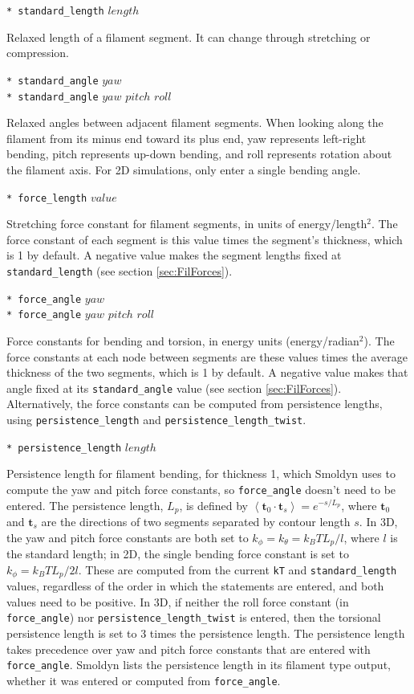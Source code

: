 \documentclass {scrbook}
\newcommand {\ttt} {\texttt}
\begin{document}
\begin{description}
\item{\ttt{* standard\_length} $length$}

Relaxed length of a filament segment. It can change through stretching or compression.

\item{\ttt{* standard\_angle} $yaw$\\
\ttt{* standard\_angle} $yaw$ $pitch$ $roll$}

Relaxed angles between adjacent filament segments. When looking along the filament from its minus end toward its plus end, yaw represents left-right bending, pitch represents up-down bending, and roll represents rotation about the filament axis. For 2D simulations, only enter a single bending angle.

\item{\ttt{* force\_length} $value$}

Stretching force constant for filament segments, in units of energy/length$^2$. The force constant of each segment is this value times the segment's thickness, which is 1 by default. A negative value makes the segment lengths fixed at \ttt{standard\_length} (see section \ref{sec:FilForces}).

\item{\ttt{* force\_angle} $yaw$\\
\ttt{* force\_angle} $yaw$ $pitch$ $roll$}

Force constants for bending and torsion, in energy units (energy/radian$^2$). The force constants at each node between segments are these values times the average thickness of the two segments, which is 1 by default. A negative value makes that angle fixed at its \ttt{standard\_angle} value (see section \ref{sec:FilForces}). Alternatively, the force constants can be computed from persistence lengths, using \ttt{persistence\_length} and \ttt{persistence\_length\_twist}.

\item{\ttt{* persistence\_length} $length$}%

Persistence length for filament bending, for thickness 1, which Smoldyn uses to compute the yaw and pitch force constants, so \ttt{force\_angle} doesn't need to be entered. The persistence length, $L_p$, is defined by $\left< \bm{t}_0 \cdot \bm{t}_s \right> = e^{-s/L_p}$, where $\bm{t}_0$ and $\bm{t}_s$ are the directions of two segments separated by contour length $s$. In 3D, the yaw and pitch force constants are both set to $k_\phi=k_\theta=k_BT L_p/l$, where $l$ is the standard length; in 2D, the single bending force constant is set to $k_\phi=k_BT L_p/2l$. These are computed from the current \ttt{kT} and \ttt{standard\_length} values, regardless of the order in which the statements are entered, and both values need to be positive. In 3D, if neither the roll force constant (in \ttt{force\_angle}) nor \ttt{persistence\_length\_twist} is entered, then the torsional persistence length is set to 3 times the persistence length. The persistence length takes precedence over yaw and pitch force constants that are entered with \ttt{force\_angle}. Smoldyn lists the persistence length in its filament type output, whether it was entered or computed from \ttt{force\_angle}.


\end{description}
\end{document}
